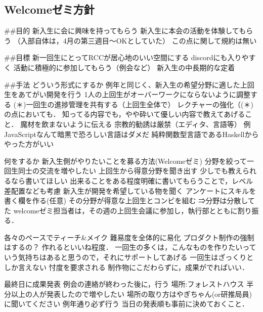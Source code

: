 \subsection*{Welcomeゼミ方針}


##目的
新入生に会に興味を持ってもらう 
新入生に本会の活動を体験してもらう
（入部自体は，4月の第三週目～OKとしていた）
この点に関して規約は無い

##目標
新一回生にとってRCCが居心地のいい空間にする
discordにも入りやすく
活動に積極的に参加してもらう（例会など）
新入生の中長期的な定着


##手法
    どういう形式にするか
        例年と同じく、新入生の希望分野に適した上回生をあてがい開発を行う
        1人の上回生がオーバーワークにならないように調整する
        (＊)一回生の進捗管理を共有する（上回生全体で）
        レクチャーの強化（(＊)の点においても．
        知ってる内容でも，やや砕いて優しい内容で教えてあげること．
        魔材を飲まないように伝える
        宗教的勧誘は厳禁（エディタ、言語等）
            例
            JavaScriptなんて暗黒で恐ろしい言語はダメだ
            純粋関数型言語であるHaskellからやった方がいい

    何をするか
        新入生側がやりたいことを募る方法(Welcomeゼミ)
            分野を絞って一回生同士の交流を増やしたい
            上回生から得意分野を聞き出す
        少しでも教えられるなら書いてほしい
            出来ることをある程度明確に書いてもらうことで，レベル差配置なども考慮
        新入生が開発を希望している物を聞く
            アンケートにスキルを書く欄を作る(任意)
        その分野が得意な上回生とコンビを組む
            ⇒分野は分散してた
            welcomeゼミ担当者は，その週の上回生会議に参加し，執行部とともに割り振る．

        各々のペースでティーチ&メイク
            難易度を全体的に易化
            プロダクト制作の強制はするの？
            作れるといいね程度．
                一回生の多くは，こんなものを作りたいっていう気持ちはあると思うので，それにサポートしてあげる
                一回生はざっくりとしか言えない
                忖度を要求される
                制作物にこだわらずに，成果がでればいい．

        最終日に成果発表
            例会の連絡が終わった後に，行う
            場所:フォレストハウス
                半分以上の人が発表したので増やしたい
                場所の取り方はやぎちゃん(or研推局員)に聞いてください
            例年通り必ず行う
            当日の発表順も事前に決めておくこと．
             
